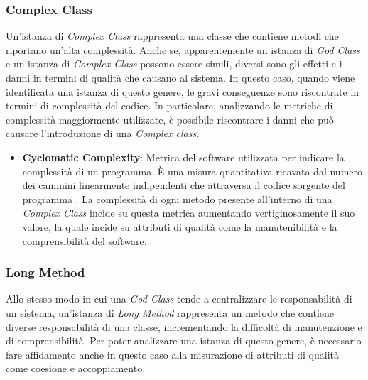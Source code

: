 \subsubsection{Complex Class}
Un'istanza di \textit{Complex Class} rappresenta una classe che contiene metodi che riportano un'alta complessità. Anche se, apparentemente un istanza di \textit{God Class} e un istanza di \textit{Complex Class} possono essere simili, diversi sono gli effetti e i danni in termini di qualità che causano al sistema. In questo caso, quando viene identificata una istanza di questo genere, le gravi conseguenze sono riscontrate in termini di complessità del codice.
In particolare, analizzando le metriche di complessità maggiormente utilizzate, è possibile riscontrare i danni che può causare l'introduzione di una \textit{Complex class}.
\begin{itemize}
    \item \textbf{Cyclomatic Complexity}: Metrica del software utilizzata per indicare la complessità di un programma. È una misura quantitativa ricavata dal numero dei cammini linearmente indipendenti che attraversa il codice sorgente del programma \cite{mccabe1976}. La complessità di ogni metodo presente all'interno di una \textit{Complex Class} incide su questa metrica aumentando vertiginosamente il suo valore, la quale incide su attributi di qualità come la manutenibilità e la comprensibilità del software.
\end{itemize}

\subsubsection{Long Method}
Allo stesso modo in cui una \textit{God Class} tende a centralizzare le responsabilità di un sistema, un'istanza di \textit{Long Method} rappresenta un metodo che contiene diverse responsabilità di una classe, incrementando la difficoltà di manutenzione e di comprensibilità. Per poter analizzare una istanza di questo genere, è necessario fare affidamento anche in questo caso alla misurazione di attributi di qualità come coesione e accoppiamento.

